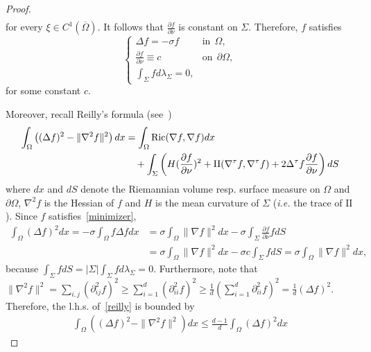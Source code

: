 \documentclass[a4paper]{article}
\theoremstyle{definition}
\numberwithin{equation}{section}
\begin{document}
\begin{proof}
\begin{align*}
\end{align*}
for every $\xi \in C^1(\overline \Omega)$. It follows that $\frac{\partial f}{\partial \nu}$ is constant on $\Sigma$. Therefore, $f$ satisfies
\begin{equation} 
\label{minimizer}
  \begin{cases}
    \Delta f= -\sigma f & \mbox{in}\ \ \Omega,\\
    \frac{\partial f}{\partial \nu} \equiv c & \mbox{on}\ \ \partial \Omega,\\
    \int_\Sigma f d\lambda_\Sigma=0,    
  \end{cases}
\end{equation}
for some constant $c$. 

Moreover, recall Reilly's formula (see~\cite{reilly})
\begin{equation}\label{reilly}
\begin{aligned}
\int_\Omega \left((\Delta f)^2 - \|\nabla^2 f \|^2 \right) dx
&=\int_\Omega \Ric (\nabla f, \nabla f) dx \\
&\quad
+%
\int_\Sigma \left( H ( \frac{\partial f}{\partial \nu})^2   +\mathrm{II} (\bnabla f, \bnabla f) +2 \Bdelta  f \frac{\partial f}{\partial \nu}\right)  dS
\end{aligned}
    \end{equation}
where $dx$ and $dS$ denote the Riemannian volume resp. surface measure on $\Omega$ and $\partial \Omega$, $\nabla^2 f$ is the Hessian of $f$ and $H$ is the mean curvature of $\Sigma$ (\textit{i.e.} the trace of $\mathrm{II}$). 
Since $f$ satisfies~\eqref{minimizer}, 
\begin{align*}
\int_\Omega (\Delta f)^2 dx
= -\sigma \int_\Omega f\Delta f dx
&=\sigma \int_\Omega \|\nabla f\|^2 dx
-\sigma 
\int_\Sigma \frac{\partial f}{\partial \nu} f dS \\
&=\sigma \int_\Omega \|\nabla f\|^2 dx
-\sigma 
c \int_\Sigma  f dS =\sigma \int_\Omega \|\nabla f\|^2 dx,
\end{align*}
because $\int_\Sigma  f dS=|\Sigma| \int_\Sigma f d\lambda_\Sigma=0$.
Furthermore, note that $\|\nabla^2 f \|^2=\sum_{i,j} (\partial_{ij}^2 f)^2\geq \sum_{i=1}^d (\partial_{ii}^2 f)^2\geq \frac{1}{d}(\sum_{i=1}^d \partial_{ii}^2 f)^2=\frac{1}{d} (\Delta f)^2$. Therefore, the l.h.s. of~\eqref{reilly} is bounded by
\begin{align*}
\int_\Omega \left((\Delta f)^2 - \|\nabla^2 f \|^2 \right) dx
\leq \frac{d-1}{d}\int_\Omega (\Delta f)^2  dx

\end{align*}
\end{proof}
\end{document}
